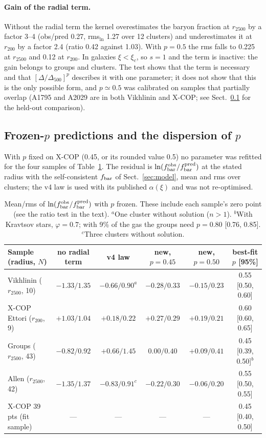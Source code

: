 \documentclass[11pt,a4paper]{article}
\newcommand{\fbar}{f_{\rm bar}}
\begin{document}
\paragraph{Gain of the radial term.} Without the radial term the kernel overestimates the baryon fraction at $r_{2500}$ by a factor 3--4 (obs/pred 0.27, rms$_{\ln}$ 1.27 over 12 clusters) and underestimates it at $r_{200}$ by a factor 2.4 (ratio 0.42 against 1.03). With $p=0.5$ the rms falls to 0.225 at $r_{2500}$ and 0.12 at $r_{200}$. In galaxies $\xi<\xi_c$, so $s=1$ and the term is inactive: the gain belongs to groups and clusters. The test shows that the term is necessary and that $[\Delta/\Delta_{500}]^p$ describes it with one parameter; it does not show that this is the only possible form, and $p\simeq0.5$ was calibrated on samples that partially overlap (A1795 and A2029 are in both Vikhlinin and X-COP; see Sect.~\ref{sec:frozen} for the held-out comparison).

\subsection{Frozen-$p$ predictions and the dispersion of $p$}
\label{sec:frozen}
With $p$ fixed on X-COP (0.45, or its rounded value 0.5) no parameter was refitted for the four samples of Table~\ref{tab:frozen}. The residual is $\ln(\fbar^{\rm obs}/\fbar^{\rm pred})$ at the stated radius with the self-consistent $\fbar$ of Sect.~\ref{sec:model}, mean and rms over clusters; the v4 law is used with its published $\alpha(\xi)$ and was not re-optimised.

\begin{table}[h]
\centering\footnotesize\setlength{\tabcolsep}{4pt}
\begin{tabular}{p{3.5cm}ccccc}
\toprule
Sample (radius, $N$) & no radial term & v4 law & new, $p=0.45$ & new, $p=0.50$ & best-fit $p$ [95\%] \\
\midrule
Vikhlinin ($r_{2500}$, 10) & $-1.33/1.35$ & $-0.66/0.90^{a}$ & $-0.28/0.33$ & $-0.15/0.23$ & 0.55 [0.50, 0.60] \\
X-COP Ettori ($r_{200}$, 9) & $+1.03/1.04$ & $+0.18/0.22$ & $+0.27/0.29$ & $+0.19/0.21$ & 0.60 [0.60, 0.65] \\
Groups ($r_{2500}$, 43) & $-0.82/0.92$ & $+0.66/1.45$ & $0.00/0.40$ & $+0.09/0.41$ & 0.45 [0.39, 0.50]$^{b}$ \\
Allen ($r_{2500}$, 42) & $-1.35/1.37$ & $-0.83/0.91^{c}$ & $-0.22/0.30$ & $-0.06/0.20$ & 0.55 [0.50, 0.55] \\
X-COP 39 pts (fit sample) & --- & --- & --- & --- & 0.45 [0.40, 0.50] \\
\bottomrule
\end{tabular}
\caption{Mean/rms of $\ln(\fbar^{\rm obs}/\fbar^{\rm pred})$ with $p$ frozen. These include each sample's zero point (see the ratio test in the text). $^{a}$One cluster without solution ($n>1$). $^{b}$With Kravtsov stars, $\varphi=0.7$; with 9\% of the gas the groups need $p=0.80$ [0.76, 0.85]. $^{c}$Three clusters without solution.}
\label{tab:frozen}
\end{table}
\end{document}
